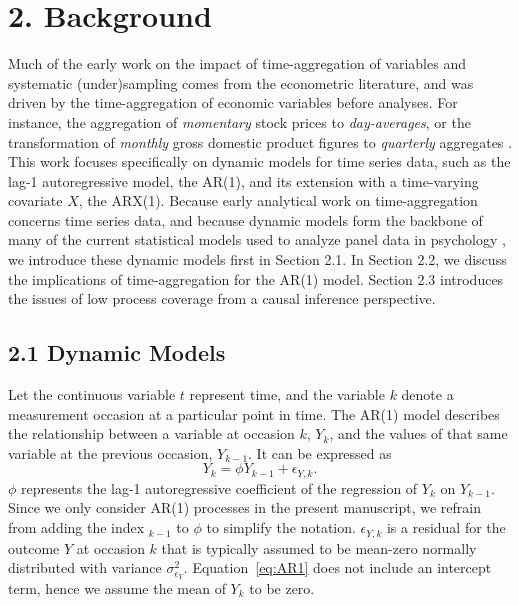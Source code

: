 \documentclass[man]{apa7} %
\begin{document}
\section{2. Background}
Much of the early work on the impact of time-aggregation of variables and systematic (under)sampling comes from the econometric literature, and was driven by the time-aggregation of economic variables before analyses. For instance, the aggregation of \textit{momentary} stock prices to \textit{day-averages}, or the transformation of \textit{monthly} gross domestic product figures to \textit{quarterly} aggregates \parencite{mundlak_aggregation_1961, telser_discrete_1967}. This work focuses specifically on dynamic models for time series data, such as the lag-1 autoregressive model, the AR(1), and its extension with a time-varying covariate $X$, the ARX(1). Because early analytical work on time-aggregation concerns time series data, and because dynamic models form the backbone of many of the current statistical models used to analyze panel data in psychology \parencite[e.g., the class of cross-lagged panel models;][]{usami_unified_2019}, we introduce these dynamic models first in Section 2.1. In Section 2.2, we discuss the implications of time-aggregation for the AR(1) model. Section 2.3 introduces the issues of low process coverage from a causal inference perspective. 

\subsection{2.1 Dynamic Models}
Let the continuous variable $t$ represent time, and the variable $k$ denote a measurement occasion at a particular point in time. The AR(1) model describes the relationship between a variable at occasion $k$, $Y_{k}$, and the values of that same variable at the previous occasion, $Y_{k - 1}$. It can be expressed as
\begin{equation} \label{eq:AR1}
    Y_{k} = \phi Y_{k - 1} + \epsilon_{Y,k}. 
\end{equation}
$\phi$ represents the lag-1 autoregressive coefficient of the regression of $Y_{k}$ on $Y_{k - 1}$. Since we only consider AR(1) processes in the present manuscript, we refrain from adding the index $_{k - 1}$ to $\phi$ to simplify the notation. $\epsilon_{Y,k}$ is a residual for the outcome $Y$ at occasion $k$ that is typically assumed to be mean-zero normally distributed with variance $\sigma_{\epsilon_{Y}}^{2}$. Equation~\ref{eq:AR1} does not include an intercept term, hence we assume the mean of $Y_{k}$ to be zero. 
\end{document}
